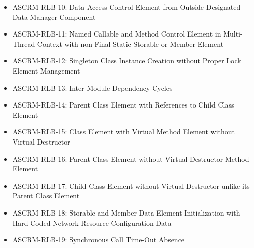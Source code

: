 \documentclass[openany,10pt,a4paper]{article}
\begin{document}
\begin{appendix}
\begin{itemize}
	\item ASCRM-RLB-10: Data Access Control Element from Outside Designated Data Manager Component
	\item ASCRM-RLB-11: Named Callable and Method Control Element in Multi-Thread Context with non-Final Static Storable or Member Element
	\item ASCRM-RLB-12: Singleton Class Instance Creation without Proper Lock Element Management
	\item ASCRM-RLB-13: Inter-Module Dependency Cycles
	\item ASCRM-RLB-14: Parent Class Element with References to Child Class Element
	\item ASCRM-RLB-15: Class Element with Virtual Method Element without Virtual Destructor
	\item ASCRM-RLB-16: Parent Class Element without Virtual Destructor Method Element
	\item ASCRM-RLB-17: Child Class Element without Virtual Destructor unlike its Parent Class Element
	\item ASCRM-RLB-18: Storable and Member Data Element Initialization with Hard-Coded Network Resource Configuration Data
	\item ASCRM-RLB-19: Synchronous Call Time-Out Absence
\end{itemize}

\end{appendix}
\end{document}
